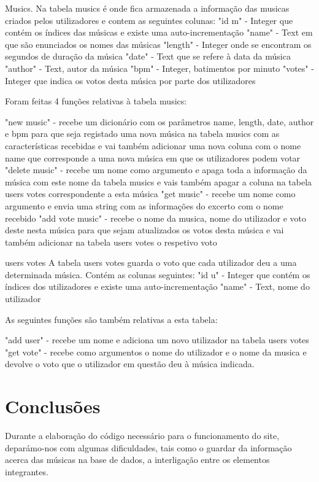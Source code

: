 \documentclass[a4paper]{report}
\begin{document}
Musics.
Na tabela musics é onde fica armazenada a informação das musicas criados pelos utilizadores e contem as seguintes colunas:
"id m" - Integer que contém os índices das músicas e existe uma auto-incrementação
"name" - Text em que são enunciados os nomes das músicas
"length" - Integer onde se encontram os segundos de duração da música
"date" - Text que se refere à data da música
"author" - Text, autor da música
"bpm" - Integer, batimentos por minuto
"votes" - Integer que indica os votos desta música por parte dos utilizadores

Foram feitas 4 funções relativas à tabela musics:

"new music" - recebe um dicionário com os parâmetros name, length, date, author e bpm para que seja registado uma nova música na tabela musics com as características recebidas e vai também adicionar uma nova coluna com o nome name que corresponde a uma nova música em que os utilizadores podem votar
"delete music" - recebe um nome como argumento e apaga toda a informação da música com este nome da tabela musics e vais também apagar a coluna na tabela users votes correspondente a esta música
"get music" - recebe um nome como argumento e envia uma string com as informações do excerto com o nome recebido
"add vote music" - recebe o nome da musica, nome do utilizador e voto deste nesta música para que sejam atualizados os votos desta música e vai também adicionar na tabela users votes o respetivo voto


users votes
A tabela users votes guarda o voto que cada utilizador deu a uma determinada música. Contém as colunas seguintes:
"id u" - Integer que contém os índices dos utilizadores e existe uma auto-incrementação
"name" - Text, nome do utilizador

As seguintes funções são também relativas a esta tabela:

"add user" - recebe um nome e adiciona um novo utilizador na tabela users votes
"get vote" - recebe como argumentos o nome do utilizador e o nome da musica e devolve o voto que o utilizador em questão deu à música indicada.

\chapter{Conclusões}
\label{chap.conclusao}

Durante a elaboração do código necessário para o funcionamento do site, deparámo-nos com algumas dificuldades, tais como o guardar da informação acerca das músicas na base de dados, a interligação entre os elementos integrantes.  
\end{document}
